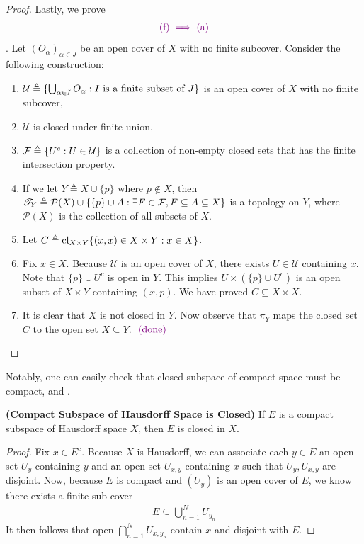 \documentclass{report}
\begin{document}
\begin{proof}
Lastly, we prove 
\begin{align*}
\textcolor{violet}{(\text{f})\implies (\text{a})}
\end{align*}
. Let $(O_\alpha)_{\alpha \in J}$ be an open cover of $X$ with no finite subcover. Consider the following construction:
\begin{enumerate}[label=(\alph*)]
    \item $\mathcal{U} \triangleq \{ \bigcup_{\alpha \in I} O_\alpha : I \text{ is a finite subset of } J \}$ is an open cover of $X$ with no finite subcover,
    \item $\mathcal{U}$ is closed under finite union,
    \item $\mathcal{F} \triangleq \{ U^c : U \in \mathcal{U} \}$ is a collection of non-empty closed sets that has the finite intersection property.
    \item If we let $Y \triangleq X \cup \{p\}$ where $p \notin X$, then $\mathscr{T}_Y \triangleq \mathcal{P}(X) \cup \{ \{p\} \cup A : \exists F \in \mathcal{F}, F \subseteq A \subseteq X \}$ is a topology on $Y$, where $\mathcal{P}(X)$ is the collection of all subsets of $X$.
    \item Let $C \triangleq \operatorname{cl}_{X \times Y} \{ (x, x) \in X \times Y : x \in X \}$.
    \item Fix $x \in X$. Because $\mathcal{U}$ is an open cover of $X$, there exists $U \in \mathcal{U}$ containing $x$. Note that $\{p\} \cup U^c$ is open in $Y$. This implies $U \times (\{p\} \cup U^c)$ is an open subset of $X \times Y$ containing $(x, p)$. We have proved $C \subseteq X \times X$.
    \item It is clear that $X$ is not closed in $Y$. Now observe that $\pi_Y$ maps the closed set $C$ to the open set $X \subseteq Y$. \CaC $\textcolor{violet}{\text{ (done) }}$
\end{enumerate}
\end{proof}
\begin{mdframed}
Notably, one can easily check that closed subspace of compact space must be compact, and . 
\end{mdframed}
\begin{theorem}
\label{Compact Subspace of Hausdorff Space is Closed}
\textbf{(Compact Subspace of Hausdorff Space is Closed)} If $E$ is a compact subspace of Hausdorff space $X$, then $E$ is closed in  $X$. 
\end{theorem}
\begin{proof}
Fix $x \in E^c$. Because $X$ is Hausdorff, we can associate each $y \in E$ an open set $U_y$ containing $y$ and an open set  $U_{x,y}$ containing $x$ such that  $U_y,U_{x,y}$ are disjoint. Now, because $E$ is compact and $(U_y)$ is an open cover of $E$, we know there exists a finite sub-cover 
\begin{align*}
E\subseteq \bigcup_{n=1}^N U_{y_n} 
\end{align*}
It then follows that open $\bigcap_{n=1}^N U_{x,y_n}$ contain $x$ and disjoint with $E$. 
\end{proof}
\end{document}
